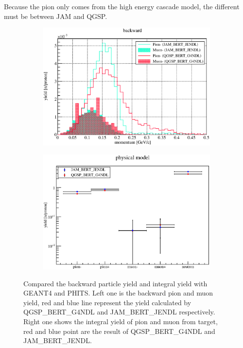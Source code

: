 Because the pion only comes from the high energy cascade model, the different must be between JAM and QGSP.
  \begin{figure}[H]
   \begin{subfigure}{0.3\textwidth}
    \centering
	\includegraphics[scale=0.43]{chapter3/fig/backward.eps}
   \end{subfigure}
   \hspace{0.2\textwidth}
   \begin{subfigure}{0.3\textwidth}
    \centering
	\includegraphics[scale=0.43]{chapter3/fig/production.eps}
   \end{subfigure}
   \caption{Compared the backward particle yield and integral yield with GEANT4 and PHITS. Left one is the backward pion and muon yield, red and blue line represent the yield calculated by QGSP\_BERT\_G4NDL and JAM\_BERT\_JENDL respectively. Right one shows the integral yield of pion and muon from target, red and blue point are the result of QGSP\_BERT\_G4NDL and JAM\_BERT\_JENDL.}
   \label{model}
  \end{figure}

